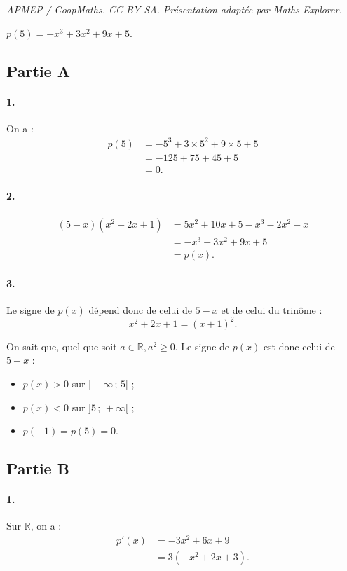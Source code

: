 \documentclass[10pt]{article}
\begin{document}
\noindent\textit{APMEP / CoopMaths. CC BY-SA. Présentation adaptée par Maths Explorer.}\par\medskip
\( p(5) = -x^3 + 3x^2 + 9x + 5\).

\subsection*{Partie A}

\paragraph{1.} On a :
\begin{align*}
p(5) &= -5^3 + 3 \times 5^2 + 9 \times 5 + 5 \\
&= -125 + 75 + 45 + 5 \\
&= 0.
\end{align*}

\paragraph{2.} 
\begin{align*}
(5 - x)(x^2 + 2x + 1) &= 5x^2 + 10x + 5 - x^3 - 2x^2 - x \\
&= -x^3 + 3x^2 + 9x + 5 \\
&= p(x).
\end{align*}

\paragraph{3.} Le signe de \( p(x) \) dépend donc de celui de \( 5 - x \) et de celui du trinôme :
\[
x^2 + 2x + 1 = (x + 1)^2.
\]

On sait que, quel que soit \(a \in \mathbb{R}, a^2 \geqslant 0\). Le signe de \( p(x) \) est donc celui de \( 5 - x \) :
\begin{itemize}
    \item \( p(x) > 0 \) sur \( ]-\infty \,;\, 5[ \) ;
    \item \( p(x) < 0 \) sur \( ]5 \,;\, +\infty[ \) ;
    \item \( p(-1) = p(5) = 0 \).
\end{itemize}

\subsection*{Partie B}

\paragraph{1.} Sur \( \mathbb{R} \), on a :
\begin{align*}
p'(x) &= -3x^2 + 6x + 9 \\
&= 3(-x^2 + 2x + 3).
\end{align*}
\end{document}
